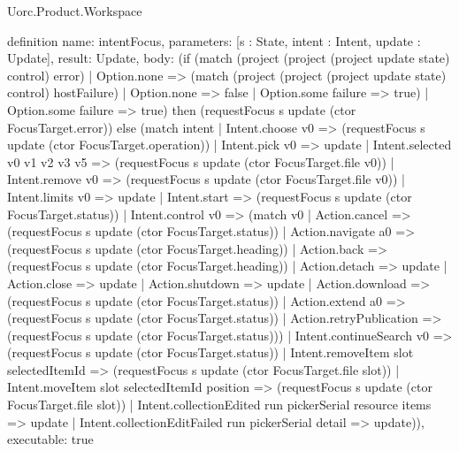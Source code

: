 \begin{lexlean}{Uorc.Product.Workspace}
\begin{semanticmodule}
definition{
  name: intentFocus,
  parameters: [s : State, intent : Intent, update : Update],
  result: Update,
  body: (if (match (project (project (project update state) control) error)
    | Option.none => (match (project (project (project update state) control) hostFailure)
      | Option.none => false
      | Option.some failure => true)
    | Option.some failure => true) then (requestFocus s update (ctor FocusTarget.error)) else (match intent
    | Intent.choose v0 => (requestFocus s update (ctor FocusTarget.operation))
    | Intent.pick v0 => update
    | Intent.selected v0 v1 v2 v3 v5 => (requestFocus s update (ctor FocusTarget.file v0))
    | Intent.remove v0 => (requestFocus s update (ctor FocusTarget.file v0))
    | Intent.limits v0 => update
    | Intent.start => (requestFocus s update (ctor FocusTarget.status))
    | Intent.control v0 => (match v0
      | Action.cancel => (requestFocus s update (ctor FocusTarget.status))
      | Action.navigate a0 => (requestFocus s update (ctor FocusTarget.heading))
      | Action.back => (requestFocus s update (ctor FocusTarget.heading))
      | Action.detach => update
      | Action.close => update
      | Action.shutdown => update
      | Action.download => (requestFocus s update (ctor FocusTarget.status))
      | Action.extend a0 => (requestFocus s update (ctor FocusTarget.status))
      | Action.retryPublication => (requestFocus s update (ctor FocusTarget.status)))
    | Intent.continueSearch v0 => (requestFocus s update (ctor FocusTarget.status))
    | Intent.removeItem slot selectedItemId => (requestFocus s update (ctor FocusTarget.file slot))
    | Intent.moveItem slot selectedItemId position => (requestFocus s update (ctor FocusTarget.file slot))
    | Intent.collectionEdited run pickerSerial resource items => update
    | Intent.collectionEditFailed run pickerSerial detail => update)),
  executable: true
}


\end{semanticmodule}
\end{lexlean}
